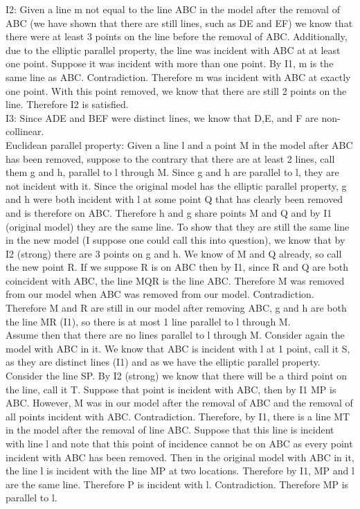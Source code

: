 \documentclass[12pt,letterpaper]{article}
\begin{document}
I2:  Given a line m not equal to the line ABC in the model after the removal of ABC (we have shown that there are still lines, such as DE and EF) we know that there were at least 3 points on the line before the removal of ABC.  Additionally, due to the elliptic parallel property, the line was incident with ABC at at least one point.  Suppose it was incident with more than one point.  By I1, m is the same line as ABC.  Contradiction.  Therefore m was incident with ABC at exactly one point.  With this point removed, we know that there are still 2 points on the line.  Therefore I2 is satisfied.\\

I3:  Since ADE and BEF were distinct lines, we know that D,E, and F are non-collinear. \\

Euclidean parallel property:  Given a line l and a point M in the model after ABC has been removed, suppose to the contrary that there are at least 2 lines, call them g and h, parallel to l through M.  Since g and h are parallel to l, they are not incident with it.  Since the original model has the elliptic parallel property, g and h were both incident with l at some point Q that has clearly been removed and is therefore on ABC.  Therefore h and g share points M and Q and by I1 (original model) they are the same line.  To show that they are still the same line in the new model (I suppose one could call this into question), we know that by I2 (strong) there are 3 points on g and h.  We know of M and Q already, so call the new point R.  If we suppose R is on ABC then by I1, since R and Q are both coincident with ABC, the line MQR is the line ABC.  Therefore M was removed from our model when ABC was removed from our model.  Contradiction.  Therefore M and R are still in our model after removing ABC, g and h are both the line MR (I1), so there is at most 1 line parallel to l through M.  \\

Assume then that there are no lines parallel to l through M.  Consider again the model with ABC in it.  We know that ABC is incident with l at 1 point, call it S, as they are distinct lines (I1) and as we have the elliptic parallel property.  Consider the line SP.  By I2 (strong) we know that there will be a third point on the line, call it T.  Suppose that point is incident with ABC, then by I1 MP is ABC.  However, M was in our model after the removal of ABC and the removal of all points incident with ABC.  Contradiction.  Therefore, by I1, there is a line MT in the model after the removal of line ABC.  Suppose that this line is incident with line l and note that this point of incidence cannot be on ABC as every point incident with ABC has been removed.  Then in the original model with ABC in it, the line l is incident with the line MP at two locations.  Therefore by I1, MP and l are the same line.  Therefore P is incident with l.  Contradiction.  Therefore MP is parallel to l.\\
\end{document}
